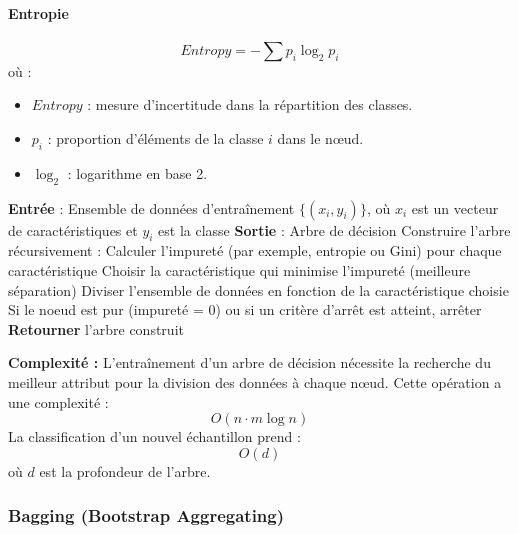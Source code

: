 \paragraph{Entropie}
\begin{equation}
Entropy = -\sum p_i \log_2 p_i
\end{equation}
où :
\begin{itemize}
    \item[-] \( Entropy \) : mesure d’incertitude dans la répartition des classes.
    \item[-] \( p_i \) : proportion d’éléments de la classe \( i \) dans le nœud.
    \item[-] \( \log_2 \) : logarithme en base 2.
\end{itemize}
\begin{algorithm}[H]
\caption{Arbre de Décision pour classification}
\begin{algorithmic}[1]
\State \textbf{Entrée} : Ensemble de données d'entraînement $\{(x_i, y_i)\}$, où $x_i$ est un vecteur de caractéristiques et $y_i$ est la classe
\State \textbf{Sortie} : Arbre de décision
\State Construire l'arbre récursivement :
        \State Calculer l'impureté (par exemple, entropie ou Gini) pour chaque caractéristique
        \State Choisir la caractéristique qui minimise l'impureté (meilleure séparation)
        \State Diviser l'ensemble de données en fonction de la caractéristique choisie
        \State Si le noeud est pur (impureté = 0) ou si un critère d'arrêt est atteint, arrêter
    \EndFor
\State \textbf{Retourner} l'arbre construit
\end{algorithmic}
\end{algorithm}
\textbf{Complexité :}  
L'entraînement d'un arbre de décision nécessite la recherche du meilleur attribut pour la division des données à chaque nœud. Cette opération a une complexité :
\begin{equation}
O(n \cdot m \log n)
\end{equation}
La classification d’un nouvel échantillon prend :
\begin{equation}
O(d)
\end{equation}
où \( d \) est la profondeur de l’arbre.



\subsubsection{Bagging (Bootstrap Aggregating)}


